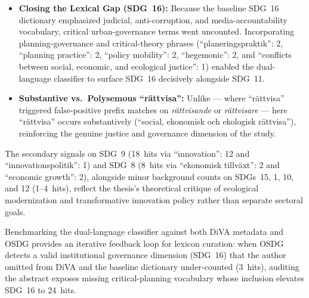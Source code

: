 \begin{casestudySection}
\begin{itemize}
    \item \textbf{Closing the Lexical Gap (\gls{SDG}~16):} Because the baseline \gls{SDG}~16 dictionary emphasized judicial, anti-corruption, and media-accountability vocabulary, critical urban-governance terms went uncounted. Incorporating planning-governance and critical-theory phrases (\enquote{\foreignlanguage{swedish}{planeringspraktik}}: 2, \enquote{planning practice}: 2, \enquote{policy mobility}: 2, \enquote{hegemonic}: 2, and \enquote{conflicts between social, economic, and ecological justice}: 1) enabled the dual-language classifier to surface \gls{SDG}~16 decisively alongside \gls{SDG}~11.

    \item \textbf{Substantive vs.\ Polysemous \enquote{\foreignlanguage{swedish}{rättvisa}}:} Unlike  --- where \enquote{\foreignlanguage{swedish}{rättvisa}} triggered false-positive prefix matches on \emph{\foreignlanguage{swedish}{rättvisande}} or \emph{\foreignlanguage{swedish}{rättvisare}} --- here \enquote{\foreignlanguage{swedish}{rättvisa}} occurs substantively (\enquote{\foreignlanguage{swedish}{social, ekonomisk och ekologisk rättvisa}}), reinforcing the genuine justice and governance dimension of the study.
\end{itemize}

The secondary signals on \gls{SDG}~9 (\num{18}~hits via \enquote{innovation}: 12 and \enquote{innovationspolitik}: 1) and \gls{SDG}~8 (\num{8}~hits via \enquote{\foreignlanguage{swedish}{ekonomisk tillväxt}}: 2 and \enquote{economic growth}: 2), alongside minor background counts on \glspl{SDG}~15, 1, 10, and 12 (\num{1}--\num{4}~hits), reflect the thesis's theoretical critique of ecological modernization and transformative innovation policy rather than separate sectoral goals.
\end{casestudySection}

\begin{takeaway}
Benchmarking the dual-language classifier against both \gls{DiVA} metadata and OSDG provides an iterative feedback loop for lexicon curation: when OSDG detects a valid institutional governance dimension (\gls{SDG}~16) that the author omitted from \gls{DiVA} and the baseline dictionary under-counted (\num{3}~hits), auditing the abstract exposes missing critical-planning vocabulary whose inclusion elevates \gls{SDG}~16 to \num{24}~hits.
\end{takeaway}


